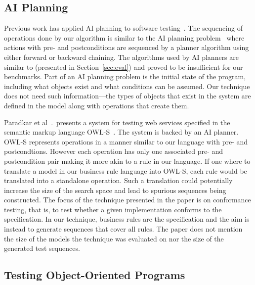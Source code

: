 \subsection{AI Planning}

Previous work has applied AI planning to software
testing~\cite{Scheetz99ai,Howe97testcase}. The sequencing of
operations done by our algorithm is similar to the AI planning
problem~\cite{Weld94} where actions with pre- and postconditions are sequenced
by a planner algorithm using either forward or backward chaining. The
algorithms used by AI planners are similar to \exhaust{}
(presented in Section~\ref{sec:eval}) and proved to be insufficient for our
benchmarks. Part of an AI planning problem is the initial state of the program,
including what objects exist and what conditions can be
assumed. Our technique does not need such information---the types of objects that
exist in the system are defined in the model along with operations
that create them. 

Paradkar et al~\cite{conf/icws/ParadkarSWJOSL07}.\ presents a system
for testing web services specified in the semantic markup language
OWL-S~\cite{owls}. The system is backed by an AI planner. OWL-S represents
operations in a manner similar to our language with pre- and
postcondtions. However each operation has only one associated pre- and
postcondition pair making it more akin to a rule in our language. If
one where to translate a model in our business rule language into
OWL-S, each rule would be translated into a standalone operation. Such
a translation could potentially increase the size of the search space
and lead to spurious sequences being constructed. The focus of the
technique presented in the paper is on conformance testing, that is,
to test whether a given implementation conforms to the specification. In
our technique, business rules are the specification and the aim is
instead to generate sequences that cover all rules. The paper does not
mention the size of the models the technique was evaluated on nor the
size of the generated test sequences.

\subsection{Testing Object-Oriented Programs}

